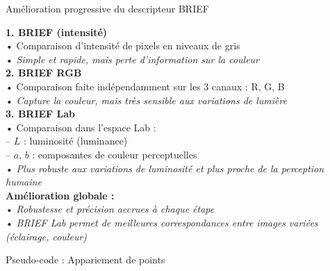 \begin{frame}{Amélioration progressive du descripteur BRIEF}
\small

\textbf{1. BRIEF (intensité)} \\
\hspace{1em}• Comparaison d’intensité de pixels en niveaux de gris \\
\hspace{1em}• \textit{Simple et rapide, mais perte d'information sur la couleur} \\

\pause
\vspace{0.5em}
\textbf{2. BRIEF RGB} \\
\hspace{1em}• Comparaison faite indépendamment sur les 3 canaux : R, G, B \\
\hspace{1em}• \textit{Capture la couleur, mais très sensible aux variations de lumière} \\

\pause
\vspace{0.5em}
\textbf{3. BRIEF Lab} \\
\hspace{1em}• Comparaison dans l’espace Lab : \\
\hspace{2em}– $L$ : luminosité (luminance) \\
\hspace{2em}– $a$, $b$ : composantes de couleur perceptuelles \\
\hspace{1em}• \textit{Plus robuste aux variations de luminosité et plus proche de la perception humaine} \\

\pause
\vspace{1em}
\textbf{Amélioration globale :} \\
\hspace{1em}• \textit{Robustesse et précision accrues à chaque étape} \\
\hspace{1em}• \textit{BRIEF Lab permet de meilleures correspondances entre images variées (éclairage, couleur)}
\end{frame}


\begin{frame}[fragile]{Pseudo-code : Appariement de points}
  
\end{frame}


